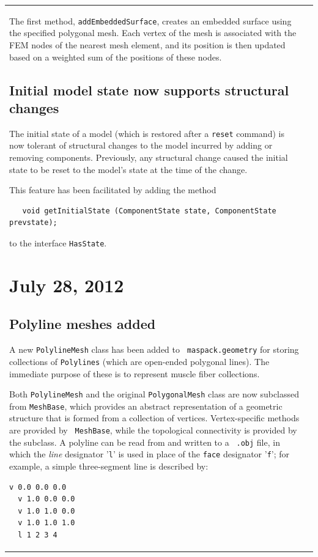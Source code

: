 \documentclass{article}
\begin{document}
\begin{tabular}{ll}
The first method, {\tt addEmbeddedSurface}, creates an embedded surface
using the specified polygonal mesh. Each vertex of the mesh is
associated with the FEM nodes of the nearest mesh element, and its
position is then updated based on a weighted sum of the positions of
these nodes.

\subsection*{Initial model state now supports structural changes}

The initial state of a model (which is restored after a {\tt reset}
command) is now tolerant of structural changes to the model incurred
by adding or removing components. Previously, any structural change
caused the initial state to be reset to the model's state at the time
of the change.

This feature has been facilitated by adding the method
\begin{verbatim}
   void getInitialState (ComponentState state, ComponentState prevstate);
\end{verbatim}
to the interface {\tt HasState}.

\section*{July 28, 2012}

\subsection*{Polyline meshes added}

A new {\tt PolylineMesh} class has been added to {\tt
maspack.geometry} for storing collections of {\tt Polylines} (which
are open-ended polygonal lines). The immediate purpose of these is to
represent muscle fiber collections.

Both {\tt PolylineMesh} and the original {\tt PolygonalMesh} class are
now subclassed from {\tt MeshBase}, which provides an abstract
representation of a geometric structure that is formed from a
collection of vertices. Vertex-specific methods are provided by {\tt
MeshBase}, while the topological connectivity is provided by the
subclass.  A polyline can be read from and written to a {\tt
.obj} file, in which the {\it line} designator '{\tt l}' is used in
place of the {\tt face} designator '{\tt f}'; for example, a simple
three-segment line is described by:
\begin{lstlisting}[]
  v 0.0 0.0 0.0
  v 1.0 0.0 0.0
  v 1.0 1.0 0.0
  v 1.0 1.0 1.0
  l 1 2 3 4
\end{lstlisting}


\end{tabular}
\end{document}
